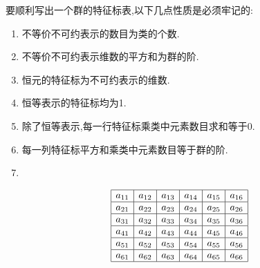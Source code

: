 \documentclass{ctexart}
\begin{document}
要顺利写出一个群的特征标表,以下几点性质是必须牢记的:
\begin{enumerate}
    \item 不等价不可约表示的数目为类的个数.
    \item 不等价不可约表示维数的平方和为群的阶.
    \item 恒元的特征标为不可约表示的维数.
    \item 恒等表示的特征标均为1.
    \item 除了恒等表示,每一行特征标乘类中元素数目求和等于0.
    \item 每一列特征标平方和乘类中元素数目等于群的阶.
    \item 
\end{enumerate}






\[
\begin{array}{|c|c|c|c|c|c|}
\hline
a_{11} & a_{12} & a_{13} & a_{14} & a_{15} & a_{16} \\
\hline
a_{21} & a_{22} & a_{23} & a_{24} & a_{25} & a_{26} \\
\hline
a_{31} & a_{32} & a_{33} & a_{34} & a_{35} & a_{36} \\
\hline
a_{41} & a_{42} & a_{43} & a_{44} & a_{45} & a_{46} \\
\hline
a_{51} & a_{52} & a_{53} & a_{54} & a_{55} & a_{56} \\
\hline
a_{61} & a_{62} & a_{63} & a_{64} & a_{65} & a_{66} \\
\hline
\end{array}
\]
\end{document}
